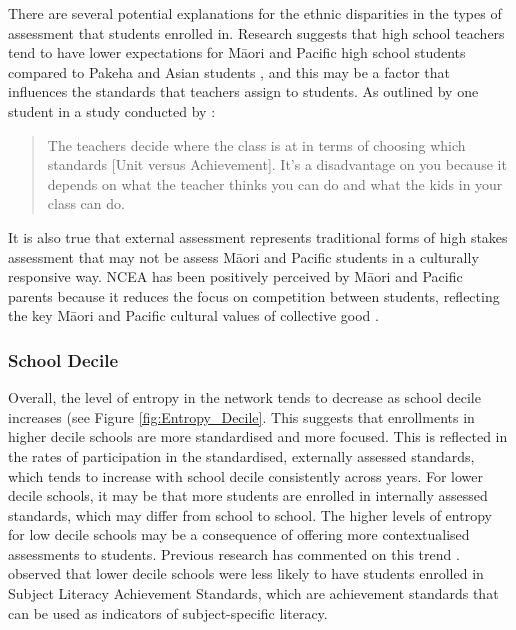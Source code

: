 There are several potential explanations for the ethnic disparities in the types of assessment that students enrolled in. Research suggests that high school teachers tend to have lower expectations for M\={a}ori and Pacific high school students compared to Pakeha and Asian students \citep{turner2015teacher}, and this may be a factor that influences the standards that teachers assign to students. As outlined by one student in a study conducted by \citet{graham2010Maori}:
\blockquote{The teachers decide where the class is at in terms of choosing which standards [Unit versus Achievement]. It's a disadvantage on you because
it depends on what the teacher thinks you can do and what the kids in your class can do.}.  It is also true that external assessment represents traditional forms of high stakes assessment that may not be assess M\={a}ori and Pacific students in a culturally responsive way. NCEA has been positively perceived by M\={a}ori and Pacific parents because it reduces the focus on competition between students, reflecting the key M\={a}ori and Pacific cultural values of collective good \citep{graham2010Maori}.


\subsubsection*{School Decile}

Overall, the level of entropy in the network tends to decrease as school decile increases (see Figure \ref{fig:Entropy_Decile}. This suggests that enrollments in higher decile schools are more standardised and more focused. This is reflected in the rates of participation in the standardised, externally assessed standards, which tends to increase with school decile consistently across years. For lower decile schools, it may be that more students are enrolled in internally assessed standards, which may differ from school to school. The higher levels of entropy for low decile schools may be a consequence of offering more contextualised assessments to students. Previous research has commented on this trend \citep{hipkins2016ncea}. \citet{wilson2017subject} observed that lower decile schools were less likely to have students enrolled in Subject Literacy Achievement Standards, which are achievement standards that can be used as indicators of subject-specific literacy.  

